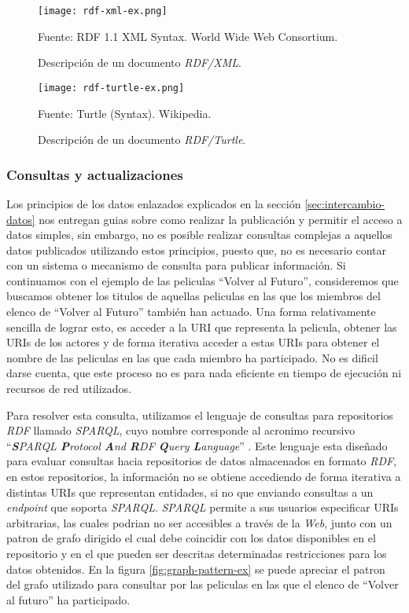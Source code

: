 \begin{figure}
    \centering
    \texttt{[image: rdf-xml-ex.png]}
    \caption{Descripción de un documento \textit{RDF/XML}.} Fuente: RDF 1.1 XML
    Syntax. World Wide Web Consortium.
    \label{fig:rdf-xml-ex}
\end{figure}

\begin{figure}
    \centering
    \texttt{[image: rdf-turtle-ex.png]}
    \caption{Descripción de un documento \textit{RDF/Turtle}.} Fuente: Turtle
    (Syntax). Wikipedia.
    \label{fig:rdf-turtle-ex}
\end{figure}

\subsubsection{Consultas y actualizaciones}

Los principios de los datos enlazados explicados en la sección
\ref{sec:intercambio-datos} nos entregan guias sobre como realizar la
publicación y permitir el acceso a datos simples, sin embargo, no es posible
realizar consultas complejas a aquellos datos publicados utilizando estos
principios, puesto que, no es necesario contar con un sistema o mecanismo de
consulta para publicar información. Si continuamos con el ejemplo de las
peliculas ``Volver al Futuro'', consideremos que buscamos obtener los titulos de
aquellas peliculas en las que los miembros del elenco de ``Volver al Futuro''
también han actuado. Una forma relativamente sencilla de lograr esto, es acceder
a la URI que representa la pelicula, obtener las URIs de los actores y de forma
iterativa acceder a estas URIs para obtener el nombre de las peliculas en las
que cada miembro ha participado. No es dificil darse cuenta, que este proceso no
es para nada eficiente en tiempo de ejecución ni recursos de red utilizados.

Para resolver esta consulta, utilizamos el lenguaje de consultas para
repositorios \textit{RDF} llamado \textit{SPARQL}, cuyo nombre corresponde al
acronimo recursivo ``\textit{\textbf{S}PARQL \textbf{P}rotocol \textbf{A}nd
\textbf{R}DF \textbf{Q}uery \textbf{L}anguage}'' \cite{world2013sparql}. Este
lenguaje esta diseñado para evaluar consultas hacia repositorios de datos
almacenados en formato \textit{RDF}, en estos repositorios, la información no se
obtiene accediendo de forma iterativa a distintas URIs que representan
entidades, si no que enviando consultas a un \textit{endpoint} que soporta
\textit{SPARQL}. \textit{SPARQL} permite a sus usuarios especificar URIs
arbitrarias, las cuales podrian no ser accesibles a través de la \textit{Web},
junto con un patron de grafo dirigido el cual debe coincidir con los datos
disponibles en el repositorio y en el que pueden ser descritas determinadas
restricciones para los datos obtenidos. En la figura \ref{fig:graph-pattern-ex}
se puede apreciar el patron del grafo utilizado para consultar por las peliculas
en las que el elenco de ``Volver al futuro'' ha participado.

